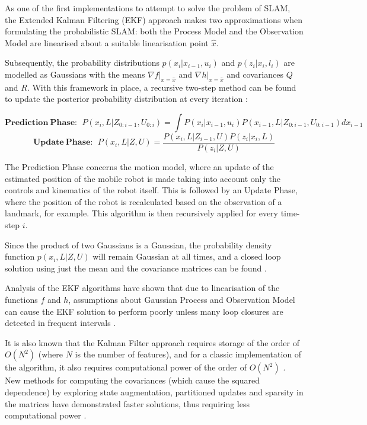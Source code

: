 \documentclass[11pt]{article}
\begin{document}
As one of the first implementations to attempt to solve the problem of SLAM, the Extended Kalman Filtering (EKF) approach makes two approximations when formulating the probabilistic SLAM: both the Process Model and the Observation Model are linearised about a suitable linearisation point $\hat{x}$.

 Subsequently, the probability distributions $p(x_i|x_{i-1}, u_i)$ and $p(z_i|x_i, l_i)$ are modelled as Gaussians with the means $\nabla f|_{x=\hat{x}}$ and $\nabla h|_{x=\hat{x}}$ and covariances $Q$ and $R$. With this framework in place, a recursive two-step method can be found to update the posterior probability distribution at every iteration \cite{SLAMPartI}:

\begin{equation*}
\mathbf{Prediction\ Phase:}\ \ 
P(x_{i},L|Z_{0:i-1}, U_{0:i}) = \int P(x_i | x_{i-1}, u_{i}) P(x_{i-1}, L |Z_{0:i-1}, U_{0:i-1})dx_{i-1}
\end{equation*}
\begin{equation*}
\mathbf{Update\ Phase:} \ \  P(x_i, L | Z, U) = \frac{P(x_{i}, L | Z_{i-1}, U)P(z_i|x_i,L)}{P(z_i|Z, U)}
\end{equation*}	 	

The Prediction Phase concerns the motion model, where an update of the estimated position of the mobile robot is made taking into account only the controls and kinematics of the robot itself. This is followed by an Update Phase, where the position of the robot is recalculated based on the observation of a landmark, for example. This algorithm is then recursively applied for every time-step $i$. 	

Since the product of two Gaussians is a Gaussian, the probability density function $p(x_i, L|Z, U)$ will remain Gaussian at all times, and a closed loop solution using just the mean and the covariance matrices can be found \cite{772544}.

Analysis of the EKF algorithms have shown that due to linearisation of the functions $f$ and $h$, assumptions about Gaussian Process and Observation Model can cause the EKF solution to perform poorly unless many loop closures are detected in frequent intervals \cite{doi:10.1177/1729881416669482}.

It is also known that the Kalman Filter approach requires storage of the order of $O(N^2)$ (where $N$ is the number of features), and for a classic implementation of the algorithm, it also requires computational power of the order of $O(N^2)$ \cite{CsorbaThesis}. New methods for computing the covariances (which cause the squared dependence) by exploring state augmentation, partitioned updates and sparsity in the matrices have demonstrated faster solutions, thus requiring less computational power \cite{SLAMPartII}.
\end{document}
